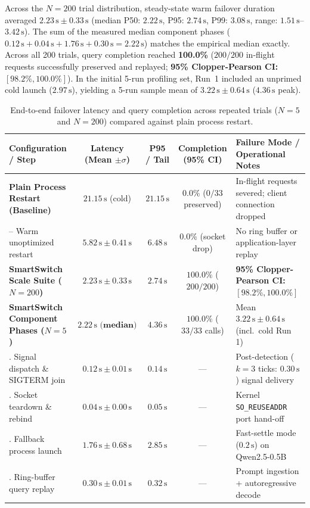 \documentclass[11pt,a4paper]{article}
\newcommand{\su}{\,\mathrm{s}}
\newcommand{\code}[1]{\texttt{#1}}
\begin{document}
Across the $N=200$ trial distribution, steady-state warm failover duration averaged \textbf{$2.23\su \pm 0.33\su$} (median P50: \textbf{$2.22\su$}, P95: \textbf{$2.74\su$}, P99: \textbf{$3.08\su$}, range: $1.51\su$--$3.42\su$). The sum of the measured median component phases ($0.12\su + 0.04\su + 1.76\su + 0.30\su = 2.22\su$) matches the empirical median exactly. Across all 200 trials, query completion reached \textbf{100.0\%} ($200/200$ in-flight requests successfully preserved and replayed; \textbf{95\% Clopper-Pearson CI: $[98.2\%, 100.0\%]$}). In the initial 5-run profiling set, Run~1 included an unprimed cold launch ($2.97\su$), yielding a 5-run sample mean of $3.22\su \pm 0.64\su$ ($4.36\su$ peak).

\begin{table}[h]
\centering
\caption{End-to-end failover latency and query completion across repeated trials ($N=5$ and $N=200$) compared against plain process restart.}\label{tab:failover}
\small
\begin{tabularx}{\linewidth}{@{}p{4.2cm}cccL@{}}
\toprule
\textbf{Configuration / Step} & \textbf{Latency (Mean $\pm \sigma$)} & \textbf{P95 / Tail} & \textbf{Completion (95\% CI)} & \textbf{Failure Mode / Operational Notes} \\
\midrule
\textbf{Plain Process Restart (Baseline)} & $21.15\su$ (cold) & $21.15\su$ & $\mathbf{0.0\%}$ ($0/33$ preserved) & In-flight requests severed; client connection dropped \\
\quad -- Warm unoptimized restart & $5.82\su \pm 0.41\su$ & $6.48\su$ & $\mathbf{0.0\%}$ (socket drop) & No ring buffer or application-layer replay \\
\midrule
\textbf{SmartSwitch Scale Suite ($N=200$)} & $\mathbf{2.23\su \pm 0.33\su}$ & $\mathbf{2.74\su}$ & $\mathbf{100.0\%}$ ($200/200$) & \textbf{95\% Clopper-Pearson CI: $[98.2\%, 100.0\%]$} \\
\midrule
\textbf{SmartSwitch Component Phases ($N=5$)} & $\mathbf{2.22\su \text{ (median)}}$ & $\mathbf{4.36\su}$ & $\mathbf{100.0\%}$ ($33/33$ calls) & Mean $3.22\su \pm 0.64\su$ (incl.\ cold Run 1) \\
. Signal dispatch \& SIGTERM join & $0.12\su \pm 0.01\su$ & $0.14\su$ & --- & Post-detection ($k=3$ ticks: $0.30\su$) signal delivery \\
. Socket teardown \& rebind & $0.04\su \pm 0.00\su$ & $0.05\su$ & --- & Kernel \code{SO\_REUSEADDR} port hand-off \\
. Fallback process launch & $1.76\su \pm 0.68\su$ & $2.85\su$ & --- & Fast-settle mode ($0.2\su$) on Qwen2.5-0.5B \\
. Ring-buffer query replay & $0.30\su \pm 0.01\su$ & $0.32\su$ & --- & Prompt ingestion + autoregressive decode \\
\bottomrule
\end{tabularx}
\end{table}
\end{document}
